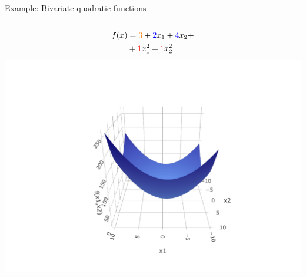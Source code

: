 \documentclass[11pt,compress,t,notes=noshow, xcolor=table]{beamer}
\begin{document}
\begin{vbframe}{Example: Bivariate quadratic functions}
\begin{columns}
  \begin{column}{0.33\textwidth}
    \begin{center}
      \begin{equation*}
        \begin{split}
          f(x) &= \textcolor{orange}{3} + \textcolor{blue}{2} x_1 + 
          \textcolor{blue}{4} x_2 + \\
          &+ \textcolor{red}{1} x_1^2 + \textcolor{red}{1} x_2^2
        \end{split}
      \end{equation*}
      \vspace*{-1.5\baselineskip}
      \includegraphics[trim = 100 10 100 50, clip, 
      width = \textwidth]{figure/hs-quadric-2.pdf}
    \end{center}
  \end{column}
  

\end{columns}
\end{vbframe}
\end{document}
